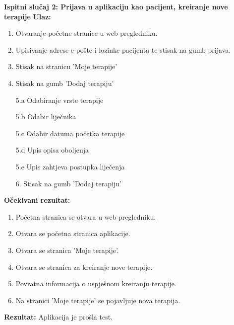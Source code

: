 \textbf{Ispitni slučaj 2: Prijava u aplikaciju kao pacijent, kreiranje nove terapije}
\textbf{Ulaz:}
\begin{enumerate}
    \item Otvaranje početne stranice u web pregledniku.
    \item Upisivanje adrese e-pošte i lozinke pacijenta te stisak na gumb prijava.
    \item Stisak na stranicu 'Moje terapije'
    \item Stisak na gumb 'Dodaj terapiju'
    \item[5.a] Odabiranje vrste terapije
    \item[5.b] Odabir liječnika
    \item[5.c] Odabir datuma početka terapije
    \item[5.d] Upis opisa oboljenja
    \item[5.e] Upis zahtjeva postupka liječenja
    \item[6.] Stisak na gumb 'Dodaj terapiju'
\end{enumerate}
\textbf{Očekivani rezultat:}
\begin{enumerate}
    \item Početna stranica se otvara u web pregledniku.
    \item Otvara se početna stranica aplikacije.
    \item Otvara se stranica 'Moje terapije'.
    \item Otvara se stranica za kreiranje nove terapije.
    \item Povratna informacija o uspješnom kreiranju terapije.
    \item Na stranici 'Moje terapije' se pojavljuje nova terapija.
\end{enumerate}
\textbf{Rezultat:} Aplikacija je prošla test.

